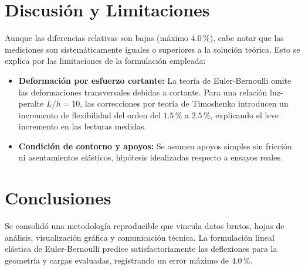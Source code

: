 \documentclass[11pt,letterpaper]{article}
\begin{document}
\section{Discusión y Limitaciones}
Aunque las diferencias relativas son bajas (máximo $4.0\,\%$), cabe notar que las mediciones son sistemáticamente iguales o superiores a la solución teórica. Esto se explica por las limitaciones de la formulación empleada:
\begin{itemize}
    \item \textbf{Deformación por esfuerzo cortante:} La teoría de Euler-Bernoulli omite las deformaciones transversales debidas a cortante. Para una relación luz-peralte $L/h = 10$, las correcciones por teoría de Timoshenko introducen un incremento de flexibilidad del orden del $1.5\,\%$ a $2.5\,\%$, explicando el leve incremento en las lecturas medidas.
    \item \textbf{Condición de contorno y apoyos:} Se asumen apoyos simples sin fricción ni asentamientos elásticos, hipótesis idealizadas respecto a ensayos reales.
\end{itemize}

\section{Conclusiones}
Se consolidó una metodología reproducible que vincula datos brutos, hojas de análisis, visualización gráfica y comunicación técnica. La formulación lineal elástica de Euler-Bernoulli predice satisfactoriamente las deflexiones para la geometría y cargas evaluadas, registrando un error máximo de $4.0\,\%$.



\end{document}
